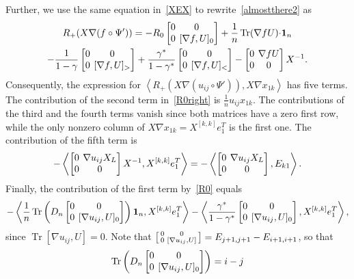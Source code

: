 \documentclass{amsart}
\theoremstyle{definition}
\theoremstyle{remark}
\numberwithin{equation}{section}
\numberwithin{theorem}{section}
\def\nablac{{\nabla}}
\def\nar{\setlength\arraycolsep{2pt}}
\def\one{\mathbf 1}
\def\Tr{\operatorname{Tr}}
\begin{document}
Further, we use the same equation in~\eqref{XEX} to rewrite~\eqref{almostthere2} as
\begin{multline}\label{R0right}
R_+(X\nabla (f\circ\Psi'))= -R_0\nar\begin{bmatrix} 0 & 0\cr 0 & [\nablac f, U]_0\end{bmatrix}
 +\frac1n\Tr (\nabla f U){\cdot}\one_n\\
-\frac1{1-\gamma}\nar\begin{bmatrix} 0 & 0\cr 0 & [\nablac f, U]_>\end{bmatrix}
+\frac{\gamma^*}{1-\gamma^*}\begin{bmatrix} 0 & 0\cr 0 & [\nablac f, U]_< \end{bmatrix}
-\begin{bmatrix}0&\nablac f U\cr 0 & 0\end{bmatrix}X^{-1}.
\end{multline}
Consequently, the expression for $\left\langle R_+(X\nabla (u_{ij}\circ\Psi')),X\nabla x_{1k}\right\rangle$ has five terms. The contribution of the second term in~\eqref{R0right} is $\frac1n u_{ij}x_{1k}$. The contributions of the third and the fourth terms vanish since both matrices have a zero first row, while the only nonzero column of 
$X\nabla x_{1k}=X^{[k,k]}e_1^T$ is the first one. The contribution of the fifth term is
\[
-\left\langle \nar\begin{bmatrix} 0 &\nablac u_{ij} X_L\cr 0&0\end{bmatrix}X^{-1},X^{[k,k]}e_1^T\right\rangle=
-\left\langle \nar\begin{bmatrix} 0 &\nablac u_{ij} X_L\cr 0&0\end{bmatrix},E_{k1}\right\rangle.
\]
Finally, the contribution of the first term by~\eqref{R0} equals
\[
-\left\langle \frac1n \Tr\left(D_n\nar\begin{bmatrix} 0 & 0\cr 0 & [\nablac u_{ij}, U]_0\end{bmatrix}\right)\one_n,
X^{[k,k]}e_1^T\right\rangle-\left\langle \frac{\gamma^*}{1-\gamma^*}\nar\begin{bmatrix} 0 & 0\cr 0 & 
[\nablac u_{ij}, U]_0\end{bmatrix},X^{[k,k]}e_1^T\right\rangle,
\]
since $\Tr [\nablac u_{ij}, U]=0$. Note that $\left[\begin{smallmatrix} 0&0\cr0&[\nablac u_{ij}, U]\end{smallmatrix}
\right]=E_{j+1,j+1}-E_{i+1,i+1}$, so that 
\[
\Tr\left(D_n\nar\begin{bmatrix} 0 & 0\cr 0 & [\nablac u_{ij}, U]_0\end{bmatrix}\right)=i-j
\]
\end{document}
